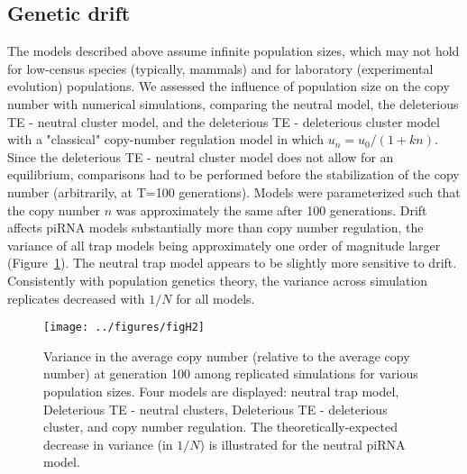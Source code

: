 \documentclass[10pt,a4paper]{article}
\begin{document}
\subsection{Genetic drift}

The models described above assume infinite population sizes, which may not hold for low-census species (typically, mammals) and for laboratory (experimental evolution) populations. We assessed the influence of population size on the copy number with numerical simulations, comparing the neutral model, the deleterious TE - neutral cluster model, and the deleterious TE - deleterious cluster model with a "classical" copy-number regulation model in which $u_n = u_0/(1+kn)$. Since the deleterious TE - neutral cluster model does not allow for an equilibrium, comparisons had to be performed before the stabilization of the copy number (arbitrarily, at T=100 generations). Models were parameterized such that the copy number $n$ was approximately the same after 100 generations. Drift affects piRNA models substantially more than copy number regulation, the variance of all trap models being approximately one order of magnitude larger (Figure~\ref{fig:figH2}). The neutral trap model appears to be slightly more sensitive to drift. Consistently with population genetics theory, the variance across simulation replicates decreased with $1/N$ for all models. 

\begin{figure}
\begin{adjustwidth}{0in}{0in}
\begin{center}
	\texttt{[image: ../figures/figH2]}
\caption{\label{fig:figH2} Variance in the average copy number (relative to the average copy number) at generation 100 among replicated simulations for various population sizes. Four models are displayed: neutral trap model, Deleterious TE - neutral clusters, Deleterious TE - deleterious cluster, and copy number regulation. The theoretically-expected decrease in variance (in $1/N$) is illustrated for the neutral piRNA model. }
\end{center}\end{adjustwidth}
\end{figure}
\end{document}
